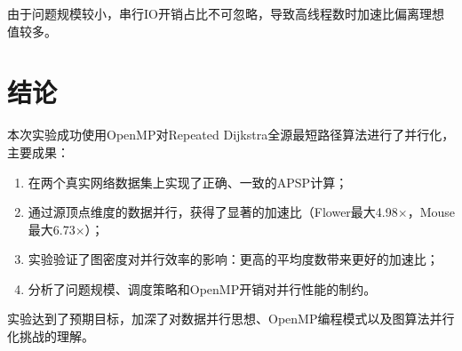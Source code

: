 \documentclass[UTF8,a4paper,12pt,fontset=none]{ctexart}
\begin{document}
由于问题规模较小，串行IO开销占比不可忽略，导致高线程数时加速比偏离理想值较多。

\section{结论}

本次实验成功使用OpenMP对Repeated Dijkstra全源最短路径算法进行了并行化，主要成果：

\begin{enumerate}[leftmargin=2.2em]
  \item 在两个真实网络数据集上实现了正确、一致的APSP计算；
  \item 通过源顶点维度的数据并行，获得了显著的加速比（Flower最大4.98$\times$，Mouse最大6.73$\times$）；
  \item 实验验证了图密度对并行效率的影响：更高的平均度数带来更好的加速比；
  \item 分析了问题规模、调度策略和OpenMP开销对并行性能的制约。
\end{enumerate}

实验达到了预期目标，加深了对数据并行思想、OpenMP编程模式以及图算法并行化挑战的理解。
\end{document}
